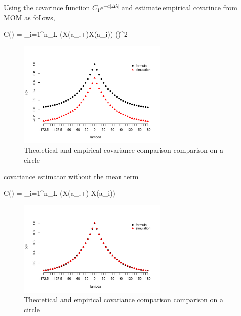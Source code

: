 Using the covarince function $C_1e^{-a|\Delta\lambda|}$ and estimate empirical covarince from MOM as follows,

\beq\label{cov:circle1}
C(\theta) =  \sum_{i=1}^{n_L} (X(a_i+\theta)\cdot X(a_i))-()^2
\eeq

\begin{figure}
\centering
\includegraphics[width=0.65\textwidth]{Summary-covarince_circle_1}
\caption {Theoretical and empirical covariance comparison comparison on a circle}
\end{figure}

covariance estimator without the mean term

\beq \label{cov:circle1}  
C(\theta) =  \sum_{i=1}^{n_L} (X(a_i+\theta) \cdot X(a_i)) 
\eeq

\begin{figure}
\centering
\includegraphics[width=0.65\textwidth]{Summary-covarince_circle_2}
\caption {Theoretical and empirical covariance comparison comparison on a circle}
\end{figure}